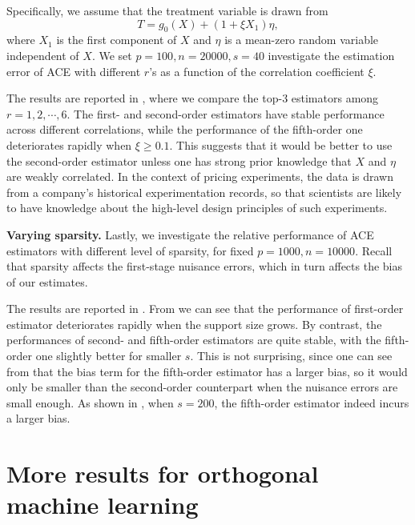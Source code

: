 \documentclass{article}
\begin{document}
Specifically, we assume that the treatment variable is drawn from
\begin{equation}
    \label{eq:model-perturbed}
    T = g_0(X) + (1+\xi X_1)\eta,
\end{equation}
where $X_1$ is the first component of $X$ and $\eta$ is a mean-zero random variable independent of $X$. We set $p=100, n=20000, s=40$ investigate the estimation error of ACE with different $r$'s as a function of the correlation coefficient $\xi$.

The results are reported in , where we compare the top-$3$ estimators among $r=1,2,\cdots,6$. The first- and second-order estimators have stable performance across different correlations, while the performance of the fifth-order one deteriorates rapidly when $\xi \geq 0.1$. This suggests that it would be better to use the second-order estimator unless one has strong prior knowledge that $X$ and $\eta$ are weakly correlated. In the context of pricing experiments, the data is drawn from a company's historical experimentation records, so that scientists are likely to have knowledge about the high-level design principles of such experiments.

\textbf{Varying sparsity.} Lastly, we investigate the relative performance of ACE estimators with different level of sparsity, for fixed $p=1000, n=10000$. Recall that sparsity affects the first-stage nuisance errors, which in turn affects the bias of our estimates. 

The results are reported in . From  we can see that the performance of first-order estimator deteriorates rapidly when the support size grows. By contrast, the performances of second- and fifth-order estimators are quite stable, with the fifth-order one slightly better for smaller $s$. This is not surprising, since one can see from  that the bias term for the fifth-order estimator has a larger bias, so it would only be smaller than the second-order counterpart when the nuisance errors are small enough. As shown in , when $s=200$, the fifth-order estimator indeed incurs a larger bias.

\section{More results for orthogonal machine learning}
\end{document}
